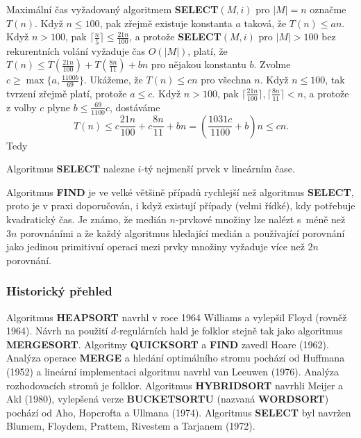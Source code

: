 \documentclass[a4paper,12pt]{article}
\begin{document}
Maximální čas vyžadovaný algoritmem  
{\bf SELECT$(M,i)$} pro $|M|=n$ označme $T(n)$.  Když $n\le 
100$, pak zřejmě 
exis\-tuje konstanta $a$ taková, že $T(n)\le an$.  Když $
n>100$, 
pak $\lceil\frac n5\rceil\le\frac {21n}{100}$, a protože {\bf SELECT$
(M,i)$} pro $|M|>100$ bez 
rekurentních volání vyžaduje čas $O(|M|)$, platí, že $
T(n)\le T(\frac {21n}{100})+T(\frac {8n}{11})+bn$ pro nějakou konstantu 
$b$.  Zvolme $c\ge\max\{a,\frac {1100b}{69}\}$. Ukážeme, že $
T(n)\le cn$ pro 
všechna $n$.  
Když $n\le 100$, tak tvrzení zřejmě platí, protože $
a\le c$.  Když 
$n>100$, pak $\lceil\frac {21n}{100}\rceil ,\lceil\frac {8n}{11}\rceil 
<n$, a protože z volby $c$ plyne 
$b\le\frac {69}{1100}c$, 
dostáváme 
$$T(n)\le c\frac {21n}{100}+c\frac {8n}{11}+bn=(\frac {1031c}{110
0}+b)n\le cn.$$
Tedy

\begin{veta}Algoritmus {\bf SELECT} nalezne $i$-tý nejmenší 
prvek v lineárním čase.
\end{veta}

Algoritmus {\bf FIND} je ve velké většině 
případů 
rychlejší než algoritmus {\bf SELECT}, proto je v praxi 
doporučován, i když existují 
případy (velmi řídké), kdy potřebuje kvadratický čas.
Je známo, že medián $n$-prvkové množiny lze nalézt s~méně než $3n$ porovnáními a že každý algoritmus hledající 
medián a používající porovnání jako jedinou primitivní 
operaci mezi prvky množiny vyžaduje více než $2n$ 
porovnání.

\subsubsection{Historický přehled}

Algoritmus {\bf HEAPSORT }
navrhl v roce 1964 Williams a vylepšil Floyd (rovněž 1964).  Návrh 
na použití $d$-regulár\-ních hald je folklor stejně tak jako  
algoritmus {\bf MER\-GESORT}.  Algoritmy {\bf QUICKSORT} a {\bf FIND }
zavedl Hoare (1962).  Analýza ope\-race {\bf MERGE} a 
hledání optimálního stro\-mu pochází od Huffmana 
(1952) a lineární implementaci algoritmu navrhl van 
Leeuwen (1976).  Analýza rozhodovacích stromů je 
folklor. Algoritmus {\bf HYBRIDSORT} navrhli Meijer a Akl (1980), 
vylepše\-ná verze {\bf BUCKETSORTU} (nazvaná {\bf WORDSORT}) 
pochází od Aho, Hopcrofta a Ullmana (1974). Algoritmus {\bf SELECT} byl 
navržen Blumem, Floydem, Prattem, Rivestem a 
Tarjanem (1972).
\end{document}

